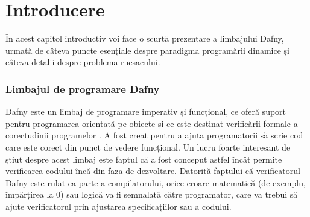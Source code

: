 \chapter*{Introducere} 

\begin{sloppypar}
În acest capitol introductiv voi face o scurtă prezentare a limbajului Dafny, urmată de câteva puncte esențiale despre paradigma programării dinamice și câteva detalii despre problema rucsacului.

\subsection*{Limbajul de programare Dafny}
Dafny este un limbaj de programare imperativ și funcțional, ce oferă suport pentru programarea orientată pe obiecte și ce este destinat verificării formale a corectudinii programelor \cite{enwiki:1265861302}. A fost creat pentru a ajuta programatorii să scrie cod care este corect din punct de vedere funcțional. Un lucru foarte interesant de știut despre acest limbaj este faptul că a fost conceput astfel încât permite verificarea codului încă din faza de dezvoltare. Datorită faptului că verificatorul Dafny este rulat ca parte a compilatorului, orice eroare matematică (de exemplu, împărțirea la 0) sau logică va fi semnalată către programator, care va trebui să ajute verificatorul prin ajustarea specificațiilor sau a codului. \cite{leino2021dafny}


\end{sloppypar}
